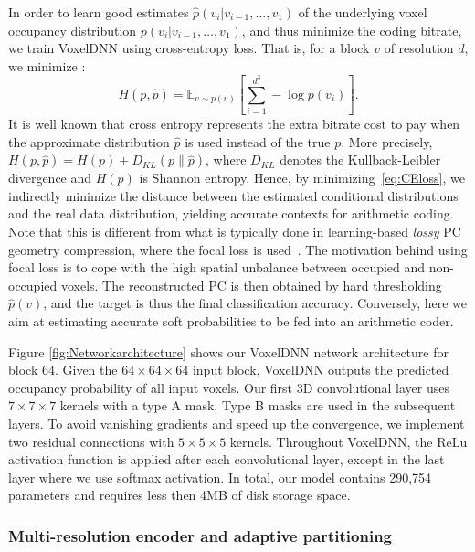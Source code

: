 \par In order to learn good estimates $\hat{p}(v_i|v_{i-1}, \ldots, v_1)$ of the underlying voxel occupancy distribution $p(v_i|v_{i-1}, \ldots, v_1)$, and thus minimize the coding bitrate, we train VoxelDNN using cross-entropy loss. That is, for a block $v$ of resolution $d$, we minimize :
\begin{equation}\label{eq:CEloss}
    H(p,\hat{p}) = \mathbb{E}_{v\sim p(v)}\left[\sum_{i=1}^{d^3} -\log \hat{p}(v_i)\right].
\end{equation}
It is well known that cross entropy represents the extra bitrate cost to pay when the approximate distribution $\hat{p}$ is used instead of the true $p$. More precisely, $H(p,\hat{p}) = H(p) + D_{KL}(p\| \hat{p})$, where $D_{KL}$ denotes the Kullback-Leibler divergence and $H(p)$ is Shannon entropy. Hence, by minimizing~\eqref{eq:CEloss}, we indirectly minimize the distance between the estimated conditional distributions and the real data distribution, yielding accurate contexts for arithmetic coding. Note that this is different from what is typically done in learning-based \textit{lossy} PC geometry compression, where the focal loss is used~\cite{quach2019learning, quach2020improved}. The motivation behind using focal loss is to cope with the high spatial unbalance between occupied and non-occupied voxels. The reconstructed PC is then obtained by hard thresholding $\hat{p}(v)$, and the target is thus the final classification accuracy. Conversely, here we aim at estimating accurate soft probabilities to be fed into an arithmetic coder.




\par Figure \ref{fig:Networkarchitecture} shows our VoxelDNN network architecture for block 64. Given the $64 \times 64 \times 64$ input block, VoxelDNN outputs the predicted occupancy probability of all input voxels. Our first 3D convolutional layer uses $7 \times 7 \times 7$ kernels with a type A mask. Type B masks are used in the subsequent layers. To avoid vanishing gradients and speed up the convergence, we implement two residual connections with $5 \times 5 \times 5$ kernels.  Throughout VoxelDNN, the ReLu activation function is applied after each convolutional layer, except in the last layer where we use softmax activation. In total, our model contains 290,754 parameters and requires less then 4MB of disk storage space.
%

\subsubsection{Multi-resolution encoder and adaptive partitioning}\label{ssec:multires}

